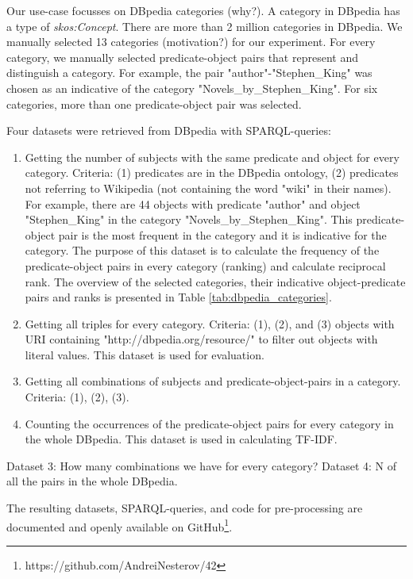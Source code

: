 \noindent
Our use-case focusses on DBpedia categories (why?). A category in DBpedia has a type of \textit{skos:Concept}.
There are more than 2 million categories in DBpedia. We manually selected 13 categories (motivation?) for our experiment.
For every category, we manually selected predicate-object pairs that represent and distinguish a category.
For example, the pair "author"-"Stephen\_King" was chosen as an indicative of the category "Novels\_by\_Stephen\_King".
For six categories, more than one predicate-object pair was selected. 

Four datasets were retrieved from DBpedia with SPARQL-queries:
\begin{enumerate}
\item Getting the number of subjects with the same predicate and object for every category.
Criteria: (1) predicates are in the DBpedia ontology, (2) predicates not referring to Wikipedia (not containing the word "wiki" in their names).
For example, there are 44 objects with predicate "author" and object "Stephen\_King" in the category "Novels\_by\_Stephen\_King".
This predicate-object pair is the most frequent in the category and it is indicative for the category.
The purpose of this dataset is to calculate the frequency of the predicate-object pairs in every category (ranking) and calculate reciprocal rank.
The overview of the selected categories, their indicative object-predicate pairs and ranks is presented in Table \ref{tab:dbpedia_categories}.
\item  Getting all triples for every category. Criteria: (1), (2), and (3) objects with URI containing "http://dbpedia.org/resource/" to filter out objects with literal values.
This dataset is used for evaluation.
\item Getting all combinations of subjects and predicate-object-pairs in a category.
Criteria: (1), (2), (3).
\item Counting the occurrences of the predicate-object pairs for every category in the whole DBpedia.
This dataset is used in calculating TF-IDF.
\end{enumerate}

Dataset 3: How many combinations we have for every category? 
Dataset 4: N of all the pairs in the whole DBpedia.

The resulting datasets, SPARQL-queries, and code for pre-processing are documented and openly available on GitHub\footnote{https://github.com/AndreiNesterov/42}.

